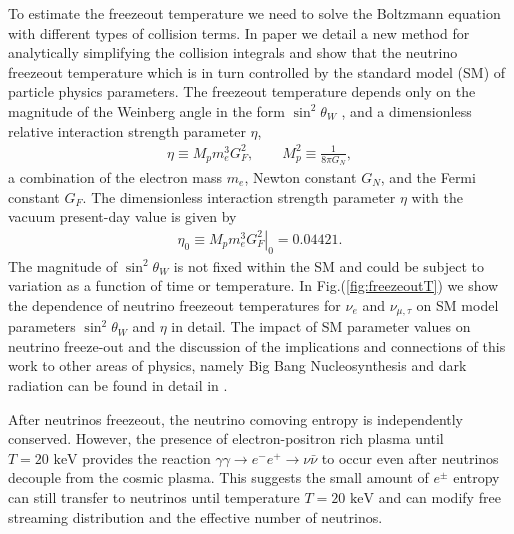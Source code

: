 \documentclass[universe,article,submit,moreauthors,pdftex,a4paper]{Definitions/mdpi}
\newcommand{\keV}{\text{ keV}}
\begin{document}

 To estimate the freezeout temperature we need to solve the Boltzmann equation with different types of collision terms. In paper \cite{Birrell:2014uka} we detail a new method for analytically simplifying the collision integrals and show that the neutrino freezeout temperature which is in turn controlled by the standard model (SM) of particle physics  parameters. The freezeout temperature depends only on the magnitude of the Weinberg angle in the form $\sin^2\theta_W$ , and a dimensionless relative interaction strength parameter $\eta$,
\begin{align}
\eta\equiv M_p m_e^3 G_F^2, \qquad M_p^2\equiv \frac{1}{8\pi G_N}, \end{align}
a combination of  the electron mass $m_e$, Newton constant $G_N$, and the Fermi constant $G_F$. The dimensionless interaction strength parameter $\eta$ with the vacuum present-day value is given by
\begin{align}
\eta_0\equiv \left.M_p m_e^3 G_F^2\right|_0  = 0.04421 .
\end{align}
The magnitude of  $\sin^2\theta_W$ is not fixed within the SM and  could be subject to variation as a function of time or temperature. In Fig.(\ref{fig:freezeoutT}) we show the dependence of neutrino freezeout temperatures for $\nu_e$ and $\nu_{\mu,\tau}$ on SM model parameters  $\sin^2\theta_W$ and $\eta$ in detail. The impact of SM parameter values on neutrino freeze-out and the discussion of the implications and connections of this work to other areas of physics, namely Big Bang Nucleosynthesis and dark radiation can be found in detail in \cite{Birrell:2014uka}.


 After neutrinos freezeout, the neutrino comoving entropy is independently conserved. However, the presence of electron-positron rich plasma until $T=20\keV$ provides the reaction $\gamma\gamma\to e^-e^+\to\nu\bar{\nu}$ to occur even after neutrinos decouple from the cosmic plasma. This suggests the small amount of $e^\pm$ entropy can still transfer to neutrinos until temperature $T=20\keV$ and can modify free streaming distribution and the effective number of neutrinos.
\end{document}
